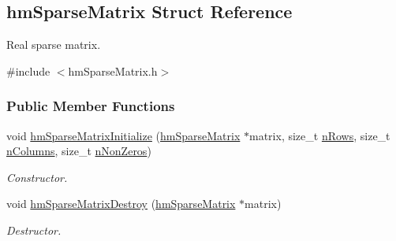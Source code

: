 \hypertarget{structhm_sparse_matrix}{\subsection{hm\-Sparse\-Matrix Struct Reference}
\label{structhm_sparse_matrix}
}


Real sparse matrix.  




{\ttfamily \#include $<$hm\-Sparse\-Matrix.\-h$>$}

\subsubsection*{Public Member Functions}
\begin{DoxyCompactItemize}
\item 
void \hyperlink{structhm_sparse_matrix_a93e31bfcd68efd7821e8d4a869c59429}{hm\-Sparse\-Matrix\-Initialize} (\hyperlink{structhm_sparse_matrix}{hm\-Sparse\-Matrix} $\ast$matrix, size\-\_\-t \hyperlink{structhm_sparse_matrix_a7fbc9f4a4303c885a43e849d118e843f}{n\-Rows}, size\-\_\-t \hyperlink{structhm_sparse_matrix_a7078245a8b4311640e4e0d4b231cfedb}{n\-Columns}, size\-\_\-t \hyperlink{structhm_sparse_matrix_aa7cd091d7d5f28c5324c85e4f9cc987f}{n\-Non\-Zeros})
\begin{DoxyCompactList}\small\item\em Constructor. \end{DoxyCompactList}\item 
void \hyperlink{structhm_sparse_matrix_a7945fa51a15592707deb55c547bbaaeb}{hm\-Sparse\-Matrix\-Destroy} (\hyperlink{structhm_sparse_matrix}{hm\-Sparse\-Matrix} $\ast$matrix)
\begin{DoxyCompactList}\small\item\em Destructor. \end{DoxyCompactList}\end{DoxyCompactItemize}
